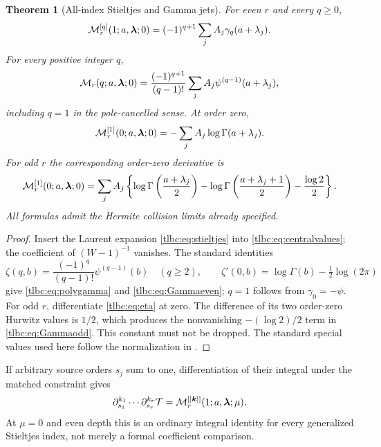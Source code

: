 \documentclass[11pt,letterpaper]{article}
\numberwithin{equation}{section}
\newtheorem{theorem}{Theorem}[section]
\theoremstyle{definition}\newtheorem{definition}[theorem]{Definition}
\theoremstyle{remark}\newtheorem{remark}[theorem]{Remark}
\newcommand{\M}{\mathcal M}\newcommand{\T}{\mathcal T}\newcommand{\K}{\mathcal K}
\begin{document}
\begin{theorem}[All-index Stieltjes and Gamma jets]\label{tlbc:thm:jets}
For even $r$ and every $q\ge0$,
\begin{equation}\label{tlbc:eq:Stieltjesjets}
 \M_r^{[q]}(1;a,\bl;0)
 =(-1)^{q+1}\sum_jA_j\gamma_q(a+\lambda_j).
\end{equation}
For every positive integer $q$,
\begin{equation}\label{tlbc:eq:polygamma}
 \M_r(q;a,\bl;0)
 =\frac{(-1)^{q+1}}{(q-1)!}
       \sum_jA_j\psi^{(q-1)}(a+\lambda_j),
\end{equation}
including $q=1$ in the pole-cancelled sense. At order zero,
\begin{equation}\label{tlbc:eq:Gammaeven}
 \M_r^{[1]}(0;a,\bl;0)=-\sum_jA_j\log\Gamma(a+\lambda_j).
\end{equation}
For odd $r$ the corresponding order-zero derivative is
\begin{equation}\label{tlbc:eq:Gammaodd}
 \M_r^{[1]}(0;a,\bl;0)
 =\sum_jA_j\left\{
 \log\Gamma\left(\frac{a+\lambda_j}{2}\right)
 -\log\Gamma\left(\frac{a+\lambda_j+1}{2}\right)
 -\frac{\log2}{2}\right\}.
\end{equation}
All formulas admit the Hermite collision limits already specified.
\end{theorem}
\begin{proof}
Insert the Laurent expansion \eqref{tlbc:eq:stieltjes} into \eqref{tlbc:eq:centralvalues}; the coefficient of $(W-1)^{-1}$ vanishes. The standard identities
\[
 \zeta(q,b)=\frac{(-1)^q}{(q-1)!}\psi^{(q-1)}(b)\quad(q\ge2),
 \qquad \zeta'(0,b)=\log\Gamma(b)-\tfrac12\log(2\pi)
\]
give \eqref{tlbc:eq:polygamma} and \eqref{tlbc:eq:Gammaeven}; $q=1$ follows from $\gamma_0=-\psi$. For odd $r$, differentiate \eqref{tlbc:eq:eta} at zero. The difference of its two order-zero Hurwitz values is $1/2$, which produces the nonvanishing $-(\log2)/2$ term in \eqref{tlbc:eq:Gammaodd}. This constant must not be dropped. The standard special values used here follow the normalization in \cite{DLMF}.
\end{proof}

If arbitrary source orders $s_j$ sum to one, differentiation of their integral under the matched constraint gives
\begin{equation}\label{tlbc:eq:independentmatchedjets}
 \partial_{s_1}^{k_1}\cdots\partial_{s_r}^{k_r}\T
 =\M_r^{[|\bk|]}(1;a,\bl;\mu).
\end{equation}
At $\mu=0$ and even depth this is an ordinary integral identity for every generalized Stieltjes index, not merely a formal coefficient comparison.
\end{document}
